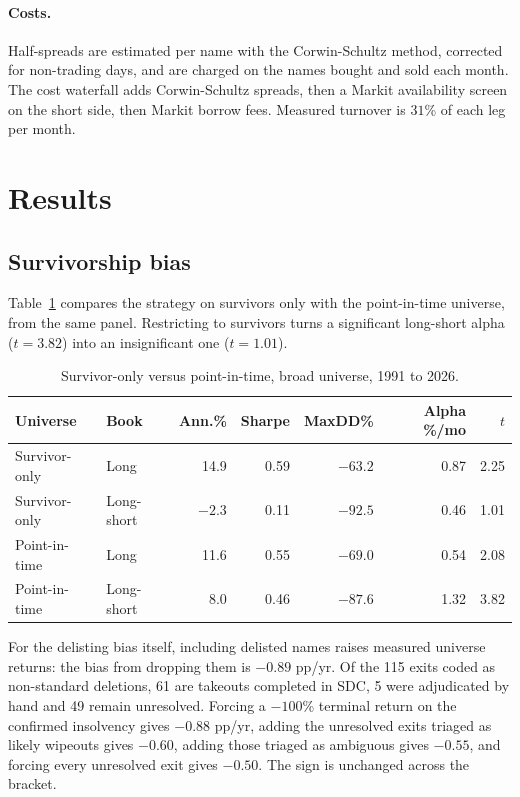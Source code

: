 \documentclass[11pt,a4paper]{article}
\begin{document}
\paragraph{Costs.} Half-spreads are estimated per name with the Corwin-Schultz method, corrected for non-trading days, and are charged on the names bought and sold each month. The cost waterfall adds Corwin-Schultz spreads, then a Markit availability screen on the short side, then Markit borrow fees. Measured turnover is $31$\% of each leg per month.

\section{Results}
\subsection{Survivorship bias}
Table~\ref{tab:surv} compares the strategy on survivors only with the point-in-time universe, from the same panel. Restricting to survivors turns a significant long-short alpha ($t=3.82$) into an insignificant one ($t=1.01$).

\begin{table}[h]
\centering
\caption{Survivor-only versus point-in-time, broad universe, 1991 to 2026.}
\label{tab:surv}
\begin{tabular}{llrrrrr}
\toprule
Universe & Book & Ann.\% & Sharpe & MaxDD\% & Alpha \%/mo & $t$ \\
\midrule
Survivor-only & Long & 14.9 & 0.59 & $-63.2$ & 0.87 & 2.25 \\
Survivor-only & Long-short & $-2.3$ & 0.11 & $-92.5$ & 0.46 & 1.01 \\
Point-in-time & Long & 11.6 & 0.55 & $-69.0$ & 0.54 & 2.08 \\
Point-in-time & Long-short & 8.0 & 0.46 & $-87.6$ & 1.32 & 3.82 \\
\bottomrule
\end{tabular}
\end{table}

For the delisting bias itself, including delisted names raises measured universe returns: the bias from dropping them is $-0.89$ pp/yr. Of the 115 exits coded as non-standard deletions, 61 are takeouts completed in SDC, 5 were adjudicated by hand and 49 remain unresolved. Forcing a $-100$\% terminal return on the confirmed insolvency gives $-0.88$ pp/yr, adding the unresolved exits triaged as likely wipeouts gives $-0.60$, adding those triaged as ambiguous gives $-0.55$, and forcing every unresolved exit gives $-0.50$. The sign is unchanged across the bracket.
\end{document}
